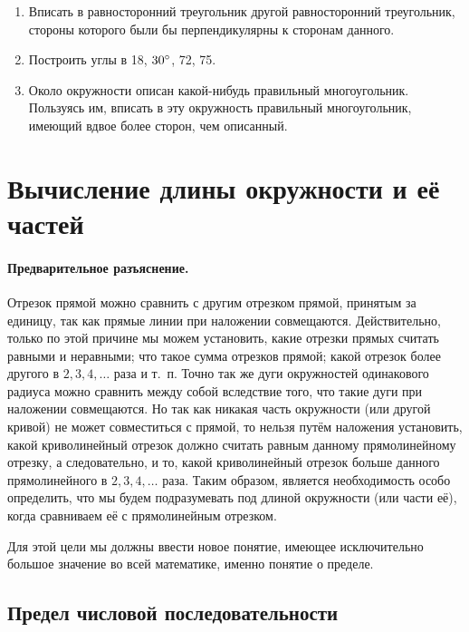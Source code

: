\documentclass[oneside]{book}
\begin{document}
\begin{enumerate}
 \item
Вписать в равносторонний треугольник другой равносторонний треугольник, стороны которого были бы перпендикулярны к сторонам данного.

 \item
Построить углы в 18\degree , $30\degree$, 72\degree , 75\degree .

\item
Около окружности описан какой-нибудь правильный многоугольник.
Пользуясь им, вписать в эту окружность правильный многоугольник, имеющий вдвое более сторон, чем описанный.

\end{enumerate}

\section{Вычисление длины окружности и её частей}

\paragraph{Предварительное разъяснение.}\label{1938/226}
Отрезок прямой можно сравнить с другим отрезком прямой, принятым за единицу, так как прямые линии при наложении совмещаются.
Действительно, только по этой причине мы можем установить, какие отрезки прямых считать равными и неравными;
что такое сумма отрезков прямой;
какой отрезок более другого в $2, 3, 4,\dots$ раза и т.~п.
Точно так же дуги окружностей одинакового радиуса можно сравнить между собой вследствие того, что такие дуги при наложении совмещаются.
Но так как никакая часть окружности (или другой кривой) не может совместиться с прямой, то нельзя путём наложения установить, какой криволинейный отрезок должно считать равным данному прямолинейному отрезку, а следовательно, и то, какой криволинейный отрезок больше данного прямолинейного в $2,3,4,\dots$
раза.
Таким образом, является необходимость особо определить, что мы будем подразумевать под длиной окружности (или части её), когда сравниваем её с прямолинейным отрезком.

Для этой цели мы должны ввести новое понятие, имеющее исключительно большое значение во всей математике, именно понятие о пределе.

\subsection*{Предел числовой последовательности}
\end{document}
